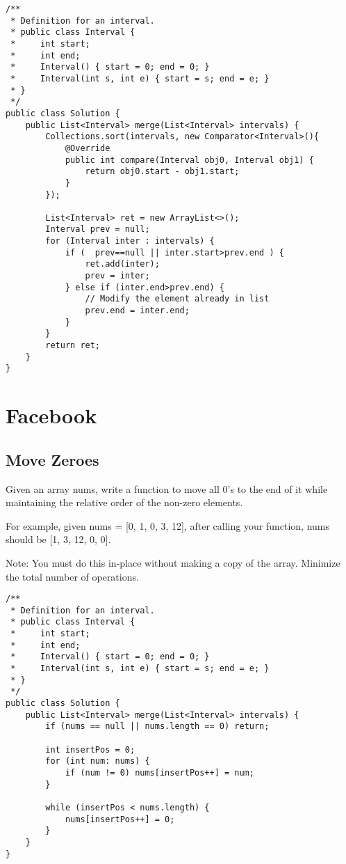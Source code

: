 \documentclass{llncs}
\begin{document}
\begin{verbatim}
/**
 * Definition for an interval.
 * public class Interval {
 *     int start;
 *     int end;
 *     Interval() { start = 0; end = 0; }
 *     Interval(int s, int e) { start = s; end = e; }
 * }
 */
public class Solution {
    public List<Interval> merge(List<Interval> intervals) {
        Collections.sort(intervals, new Comparator<Interval>(){
            @Override
            public int compare(Interval obj0, Interval obj1) {
                return obj0.start - obj1.start;
            }
        });

        List<Interval> ret = new ArrayList<>();
        Interval prev = null;
        for (Interval inter : intervals) {
            if (  prev==null || inter.start>prev.end ) {
                ret.add(inter);
                prev = inter;
            } else if (inter.end>prev.end) {
                // Modify the element already in list
                prev.end = inter.end;
            }
        }
        return ret;
    }
}
\end{verbatim}

\section{Facebook}
\subsection{Move Zeroes}
Given an array nums, write a function to move all 0's to the end of it while maintaining the relative order of the non-zero elements.

For example, given nums = [0, 1, 0, 3, 12], after calling your function, nums should be [1, 3, 12, 0, 0].

Note:
You must do this in-place without making a copy of the array.
Minimize the total number of operations.

\begin{verbatim}
/**
 * Definition for an interval.
 * public class Interval {
 *     int start;
 *     int end;
 *     Interval() { start = 0; end = 0; }
 *     Interval(int s, int e) { start = s; end = e; }
 * }
 */
public class Solution {
    public List<Interval> merge(List<Interval> intervals) {
        if (nums == null || nums.length == 0) return;

        int insertPos = 0;
        for (int num: nums) {
            if (num != 0) nums[insertPos++] = num;
        }

        while (insertPos < nums.length) {
            nums[insertPos++] = 0;
        }
    }
}
\end{verbatim}
\end{document}
